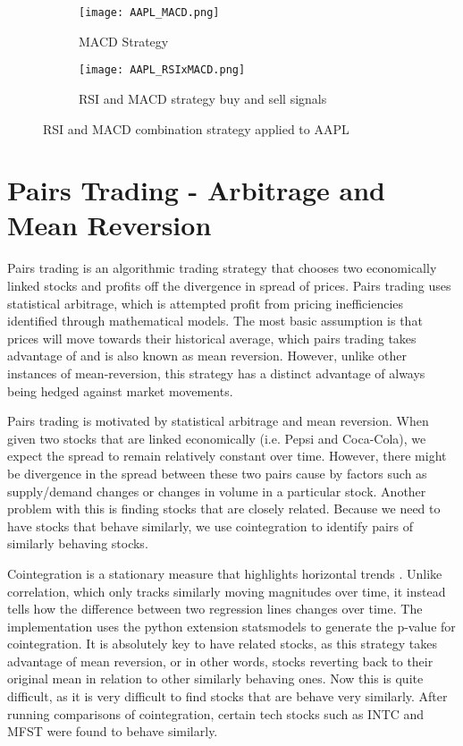 \documentclass[../thesis.tex]{subfiles}
\begin{document}
\begin{figure}[h]
\centering

\begin{subfigure}[t]{0.45\textwidth}
\texttt{[image: AAPL\_MACD.png]}
\caption{MACD Strategy \label{overflow}}
\end{subfigure}
\begin{subfigure}[t]{0.45\textwidth}
\texttt{[image: AAPL\_RSIxMACD.png]}
\caption{RSI and MACD strategy buy and sell signals \label{overflow}}
\end{subfigure}

\caption{RSI and MACD combination strategy applied to AAPL  \label{overflow}}
\label{RSIMACDfigure}
\end{figure}

\section{Pairs Trading - Arbitrage and Mean Reversion}

Pairs trading is an algorithmic trading strategy that chooses two economically linked stocks and profits off the divergence in spread of prices. Pairs trading uses statistical arbitrage, which is attempted profit from pricing inefficiencies identified through mathematical models. The most basic assumption is that prices will move towards their historical average, which pairs trading takes advantage of and is also known as mean reversion.  However, unlike other instances of mean-reversion, this strategy has a distinct advantage of always being hedged against market movements. 

Pairs trading is motivated by statistical arbitrage and mean reversion\cite{Fu2009}. When given two stocks that are linked economically (i.e. Pepsi and Coca-Cola), we expect the spread to remain relatively constant over time. However, there might be divergence in the spread between these two pairs cause by factors such as supply/demand changes or changes in volume in a particular stock.  Another problem with this is finding stocks that are closely related. Because we need to have stocks that behave similarly, we use cointegration to identify pairs of similarly behaving stocks. 

Cointegration is a stationary measure that highlights horizontal trends \cite{Gatev2006}. Unlike correlation, which only tracks similarly moving magnitudes over time, it instead tells how the difference between two regression lines changes over time. The implementation uses the python extension statsmodels to generate the p-value for cointegration. It is absolutely key to have related stocks, as this strategy takes advantage of mean reversion, or in other words, stocks reverting back to their original mean in relation to other similarly behaving ones. Now this is quite difficult, as it is very difficult to find stocks that are behave very similarly. After running comparisons of cointegration, certain tech stocks such as INTC and MFST were found to behave similarly.  
\end{document}
